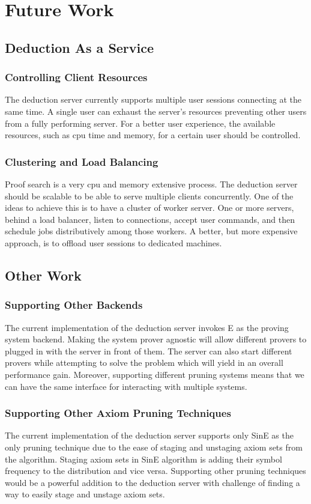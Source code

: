 \chapter{Future Work}
\label{chap:todo}

\section{Deduction As a Service}

\subsection{Controlling Client Resources}
The deduction server currently supports multiple user sessions connecting at the same time. A single user can exhaust the server's resources preventing other users from a fully performing server. For a better user experience, the available resources, such as \ac{cpu} time and memory, for a certain user should be controlled.

\subsection{Clustering and Load Balancing}
Proof search is a very \ac{cpu} and memory extensive process. The deduction server should be scalable to be able to serve multiple clients concurrently. One of the ideas to achieve this is to have a cluster of worker server. One or more servers, behind a load balancer, listen to connections, accept user commands, and then schedule jobs distributively among those workers. A better, but more expensive approach, is to offload user sessions to dedicated machines.


\section{Other Work}
\subsection{Supporting Other Backends}
The current implementation of the deduction server invokes E as the proving system backend. Making the system prover agnostic will allow different provers to plugged in with the server in front of them. The server can also start different provers while attempting to solve the problem which will yield in an overall performance gain. Moreover, supporting different pruning systems means that we can have the same interface for interacting with multiple systems.

\subsection{Supporting Other Axiom Pruning Techniques}
The current implementation of the deduction server supports only SinE as the only pruning technique due to the ease of staging and unstaging axiom sets from the algorithm. Staging axiom sets in SinE algorithm is adding their symbol frequency to the distribution and vice versa. Supporting other pruning techniques would be a powerful addition to the deduction server with challenge of finding a way to easily stage and unstage axiom sets.

